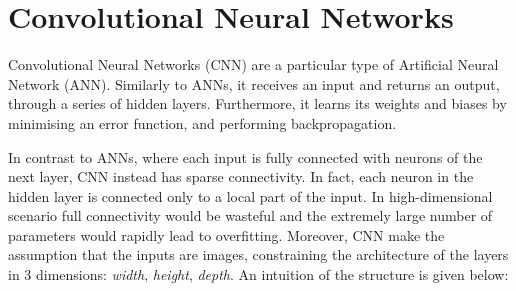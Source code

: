 \section{Convolutional Neural Networks}
Convolutional Neural Networks (CNN) are a particular type of Artificial Neural Network (ANN). Similarly to ANNs, it receives an input and returns an output, through a series of hidden layers. Furthermore, it learns its weights and biases by minimising an error function, and performing backpropagation. 

In contrast to ANNs, where each input is fully connected with neurons of the next layer, CNN instead has sparse connectivity. In fact, each neuron in the hidden layer is connected only to a local part of the input. In high-dimensional scenario full connectivity would be wasteful and the extremely large number of parameters would rapidly lead to overfitting. Moreover, CNN make the assumption that the inputs are images, constraining the architecture of the layers in 3 dimensions: \textit{width}, \textit{height}, \textit{depth}. An intuition of the structure is given below:

